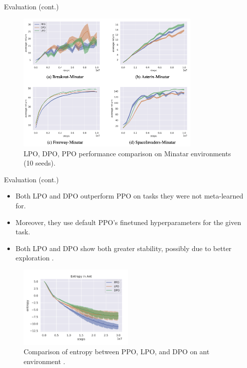 \documentclass[9pt]{beamer}
\begin{document}
\begin{frame}{Evaluation (cont.)}

  \begin{figure}
    \centering
    \includegraphics[width=0.8\textwidth]{figures/minatar.png}
    \caption{LPO, DPO, PPO performance comparison \cite{dpo2022} on Minatar \cite{young19minatar} environments (10 seeds).}
    \label{fig:trl8}
  \end{figure}

\end{frame}
\begin{frame}{Evaluation (cont.)}

  
    \vfill
  \begin{itemize}
    \item Both LPO and DPO outperform PPO on tasks they were not meta-learned for.
    \vfill
    \item Moreover, they use default PPO's finetuned hyperparameters for the given task.
    \vfill
    \pause
    \item Both LPO and DPO show both greater stability, possibly due to better exploration \cite{dpo2022}.
\end{itemize}
    
    \vfill
  \begin{figure}
    \centering
    \includegraphics[width=0.5\textwidth]{figures/results4_entropy.png}
    \caption{Comparison of entropy between PPO, LPO, and DPO on ant environment \cite{dpo2022}.}
    \label{fig:trl9}
  \end{figure}

\end{frame}
\end{document}
